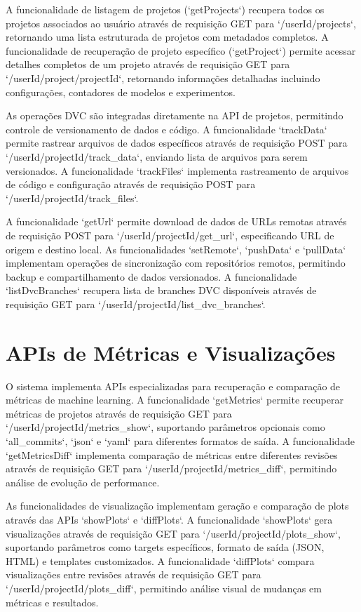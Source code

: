 \documentclass[12pt,a4paper]{article}
\begin{document}
A funcionalidade de listagem de projetos (`getProjects`) recupera todos os projetos associados ao usuário através de requisição GET para `/{userId}/projects`, retornando uma lista estruturada de projetos com metadados completos. A funcionalidade de recuperação de projeto específico (`getProject`) permite acessar detalhes completos de um projeto através de requisição GET para `/{userId}/project/{projectId}`, retornando informações detalhadas incluindo configurações, contadores de modelos e experimentos.

As operações DVC são integradas diretamente na API de projetos, permitindo controle de versionamento de dados e código. A funcionalidade `trackData` permite rastrear arquivos de dados específicos através de requisição POST para `/{userId}/{projectId}/track_data`, enviando lista de arquivos para serem versionados. A funcionalidade `trackFiles` implementa rastreamento de arquivos de código e configuração através de requisição POST para `/{userId}/{projectId}/track_files`.

A funcionalidade `getUrl` permite download de dados de URLs remotas através de requisição POST para `/{userId}/{projectId}/get_url`, especificando URL de origem e destino local. As funcionalidades `setRemote`, `pushData` e `pullData` implementam operações de sincronização com repositórios remotos, permitindo backup e compartilhamento de dados versionados. A funcionalidade `listDvcBranches` recupera lista de branches DVC disponíveis através de requisição GET para `/{userId}/{projectId}/list_dvc_branches`.

\section{APIs de Métricas e Visualizações}

O sistema implementa APIs especializadas para recuperação e comparação de métricas de machine learning. A funcionalidade `getMetrics` permite recuperar métricas de projetos através de requisição GET para `/{userId}/{projectId}/metrics_show`, suportando parâmetros opcionais como `all_commits`, `json` e `yaml` para diferentes formatos de saída. A funcionalidade `getMetricsDiff` implementa comparação de métricas entre diferentes revisões através de requisição GET para `/{userId}/{projectId}/metrics_diff`, permitindo análise de evolução de performance.

As funcionalidades de visualização implementam geração e comparação de plots através das APIs `showPlots` e `diffPlots`. A funcionalidade `showPlots` gera visualizações através de requisição GET para `/{userId}/{projectId}/plots_show`, suportando parâmetros como targets específicos, formato de saída (JSON, HTML) e templates customizados. A funcionalidade `diffPlots` compara visualizações entre revisões através de requisição GET para `/{userId}/{projectId}/plots_diff`, permitindo análise visual de mudanças em métricas e resultados.
\end{document}
